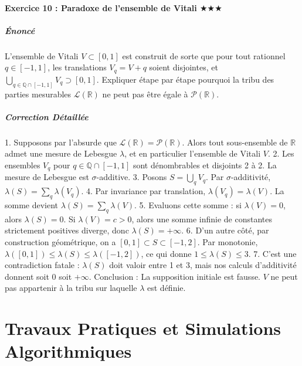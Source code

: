\documentclass[11pt,a4paper]{article}
\begin{document}
\subsection*{Exercice 10 : Paradoxe de l'ensemble de Vitali \quad $\displaystyle \bigstar\bigstar\bigstar$}


\subsubsection*{Énoncé}

L'ensemble de Vitali $V \subset [0, 1]$ est construit de sorte que pour tout rationnel $q \in [-1, 1]$, les translations $V_q = V+q$ soient disjointes, et $\bigcup_{q \in \mathbb{Q} \cap [-1, 1]} V_q \supset [0, 1]$. Expliquer étape par étape pourquoi la tribu des parties mesurables $\mathcal{L}(\mathbb{R})$ ne peut pas être égale à $\mathcal{P}(\mathbb{R})$.

\subsubsection*{Correction Détaillée}

1. Supposons par l'absurde que $\mathcal{L}(\mathbb{R}) = \mathcal{P}(\mathbb{R})$. Alors tout sous-ensemble de $\mathbb{R}$ admet une mesure de Lebesgue $\lambda$, et en particulier l'ensemble de Vitali $V$.
2. Les ensembles $V_q$ pour $q \in \mathbb{Q} \cap [-1, 1]$ sont dénombrables et disjoints 2 à 2. La mesure de Lebesgue est $\sigma$-additive.
3. Posons $S = \bigcup_q V_q$. Par $\sigma$-additivité, $\lambda(S) = \sum_q \lambda(V_q)$.
4. Par invariance par translation, $\lambda(V_q) = \lambda(V)$. La somme devient $\lambda(S) = \sum_{q} \lambda(V)$.
5. Evaluons cette somme : si $\lambda(V) = 0$, alors $\lambda(S) = 0$. Si $\lambda(V) = c > 0$, alors une somme infinie de constantes strictement positives diverge, donc $\lambda(S) = +\infty$.
6. D'un autre côté, par construction géométrique, on a $[0, 1] \subset S \subset [-1, 2]$. Par monotonie, $\lambda([0, 1]) \le \lambda(S) \le \lambda([-1, 2])$, ce qui donne $1 \le \lambda(S) \le 3$.
7. C'est une contradiction fatale : $\lambda(S)$ doit valoir entre 1 et 3, mais nos calculs d'additivité donnent soit 0 soit $+\infty$.
Conclusion : La supposition initiale est fausse. $V$ ne peut pas appartenir à la tribu sur laquelle $\lambda$ est définie.


\part{Travaux Pratiques et Simulations Algorithmiques}
\end{document}
